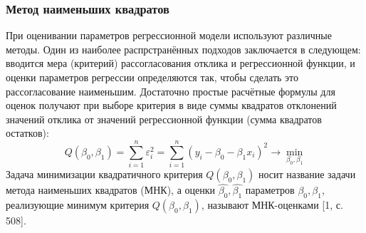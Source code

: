 \documentclass[a4paper]{article}
\begin{document}
            \subsubsection{Метод наименьших квадратов}
            \noindent При оценивании параметров регрессионной модели используют различные методы. Один из наиболее распрстранённых подходов заключается в следующем: вводится мера (критерий) рассогласования отклика и регрессионной функции, и оценки параметров регрессии определяются так, чтобы сделать это рассогласование наименьшим. Достаточно простые расчётные формулы для оценок получают при выборе критерия в виде суммы квадратов отклонений значений отклика от значений регрессионной функции (сумма квадратов остатков):
            \begin{equation}
                Q(\beta_{0}, \beta_{1}) = \sum_{i=1}^{n}{\varepsilon_{i}^{2}} =
                \sum_{i=1}^{n}{(y_{i} - \beta_{0} - \beta_{1}x_{i})^{2}}\rightarrow \min_{\beta_{0}, \beta_{1}}
                \label{Q_beta}
            \end{equation}
            Задача минимизации квадратичного критерия $Q(\beta_0, \beta_1)$ носит название задачи метода наименьших квадратов (МНК), а оценки $\hat{\beta_0}, \hat{\beta_1}$ параметров $\beta_0, \beta_1$, реализующие минимум критерия $Q(\beta_0, \beta_1)$, называют МНК-оценками [1, с. 508].
\end{document}
